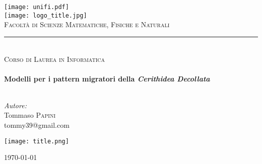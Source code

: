 \begin{titlepage}
	\begin{center}
		
		\texttt{[image: unifi.pdf]}\\[0.5cm]
		
		\texttt{[image: logo\_title.jpg]}\\
		\textsc{Facoltà di Scienze Matematiche, Fisiche e Naturali}\\
		\rule{0.8\linewidth}{0.2mm}\\
		\textsc{\footnotesize Corso di Laurea in Informatica}\\[1.8cm]
		
		\HRule \\[0.4cm]
		{\huge \bfseries Modelli per i pattern migratori della \textit{Cerithidea Decollata}}\\[0.4cm]
		\HRule \\[0.6cm]
		
		\begin{flushleft}
			\begin{minipage}{0.4\textwidth}
				\emph{Autore:}\\
				Tommaso \textsc{Papini}\\
				tommy39@gmail.com\\[0.2cm]
			\end{minipage}
		\end{flushleft}
		
		\texttt{[image: title.png]}
		
		\vfill
		
		{\large \today}
		
	\end{center}
\end{titlepage}
